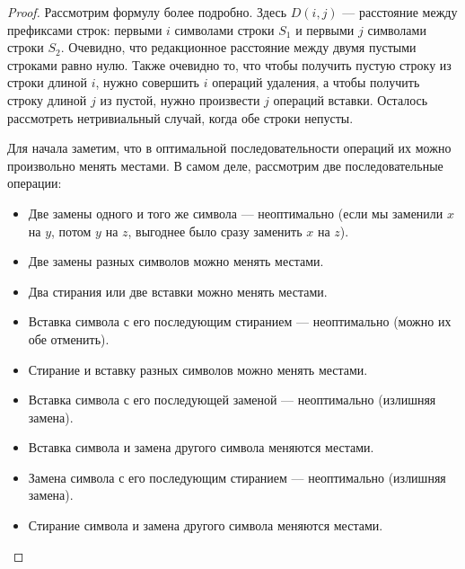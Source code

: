 \begin{proof}
    Рассмотрим формулу более подробно.
    Здесь $D(i,j)$ --- расстояние между префиксами строк: первыми $i$ символами строки $S_1$ и первыми $j$ символами строки $S_2$.
    Очевидно, что редакционное расстояние между двумя пустыми строками равно нулю.
    Также очевидно то, что чтобы получить пустую строку из строки длиной $i$, нужно совершить $i$ операций удаления, а чтобы получить строку длиной $j$ из пустой, нужно произвести $j$ операций вставки.
    Осталось рассмотреть нетривиальный случай, когда обе строки непусты.

    Для начала заметим, что в оптимальной последовательности операций их можно произвольно менять местами.
    В самом деле, рассмотрим две последовательные операции:

    \begin{itemize}
        \item Две замены одного и того же символа --- неоптимально (если мы заменили $x$ на $y$, потом $y$ на $z$, выгоднее было сразу заменить $x$ на $z$).
        \item Две замены разных символов можно менять местами.
        \item Два стирания или две вставки можно менять местами.
        \item Вставка символа с его последующим стиранием --- неоптимально (можно их обе отменить).
        \item Стирание и вставку разных символов можно менять местами.
        \item Вставка символа с его последующей заменой --- неоптимально (излишняя замена).
        \item Вставка символа и замена другого символа меняются местами.
        \item Замена символа с его последующим стиранием --- неоптимально (излишняя замена).
        \item Стирание символа и замена другого символа меняются местами.
    \end{itemize}


\end{proof}
